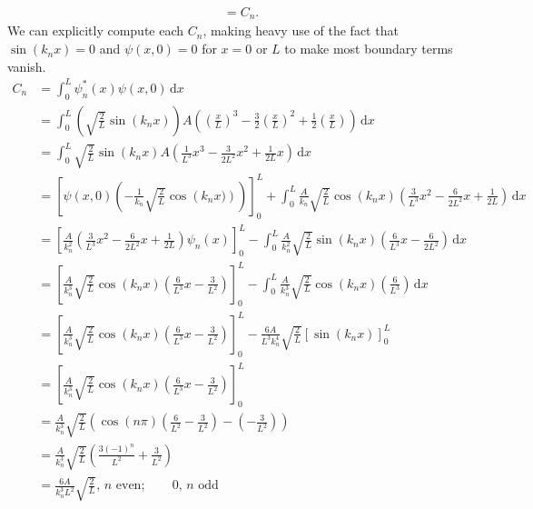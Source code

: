 \documentclass[11pt, letterpaper]{article}
\begin{document}
\begin{enumerate}
\begin{align*}
									 &=C_n
		.\end{align*}
		We can explicitly compute each $C_n$, making heavy use of the fact that $\sin (k_nx)=0$ and $\psi (x,0)=0$ for $x=0$ or $L$ to make most boundary terms vanish.
		\begin{align*}
			C_n&=\int_{0}^{L} \psi _n^*(x)\psi (x,0) \,\mathrm{d} x\\
			   &=\int_{0}^{L} \left( \sqrt{\frac{2}{L} } \sin (k_nx) \right) A\left( \left( \frac{x}{L}  \right)^3-\frac{3}{2} \left( \frac{x}{L}  \right) ^2+\frac{1}{2} \left( \frac{x}{L}  \right)  \right)  \,\mathrm{d} x\\
			   &=\int_{0}^{L} \sqrt{\frac{2}{L} } \sin \left( k_nx \right) A\left( \frac{1}{L^3} x^3-\frac{3}{2L^2} x^2+\frac{1}{2L} x \right)  \,\mathrm{d} x\\
			   &=\left[ \psi (x,0)\left( -\frac{1}{k_n} \sqrt{\frac{2}{L} } \cos \left( k_nx) \right)  \right)  \right]_{0}^{L} +\int_{0}^{L}\frac{A}{k_n} \sqrt{\frac{2}{L} } \cos \left( k_nx \right) \left( \frac{3}{L^3} x^2-\frac{6}{2L^2} x+\frac{1}{2L}  \right)   \,\mathrm{d} x\\
			   &=\left[ \frac{A}{k_n^2} \left( \frac{3}{L^3} x^2-\frac{6}{2L^2} x+\frac{1}{2L}  \right) \psi_n(x) \right]_0^L-\int_{0}^{L} \frac{A}{k_n^2} \sqrt{\frac{2}{L} } \sin \left( k_nx \right) \left( \frac{6}{L^3} x-\frac{6}{2L^2}  \right)  \,\mathrm{d} x\\
			   &=\left[ \frac{A}{k_n^3} \sqrt{\frac{2}{L} } \cos \left( k_nx \right) \left( \frac{6}{L^3} x-\frac{3}{L^2}  \right)  \right]_0^L-\int_{0}^{L} \frac{A}{k_n^3} \sqrt{\frac{2}{L} } \cos \left( k_nx \right) \left( \frac{6}{L^3}  \right)  \,\mathrm{d} x\\
			   &=\left[ \frac{A}{k_n^3} \sqrt{\frac{2}{L} } \cos \left( k_nx \right) \left( \frac{6}{L^3} x-\frac{3}{L^2}  \right)  \right]_0^L-\frac{6A}{L^3k_n^4} \sqrt{\frac{2}{L} } \left[ \sin \left( k_nx \right)  \right]_0^L\\
			   &=\left[ \frac{A}{k_n^3} \sqrt{\frac{2}{L} } \cos \left( k_nx \right) \left( \frac{6}{L^3} x-\frac{3}{L^2}  \right)  \right]_0^L\\
			   &=\frac{A}{k_n^3} \sqrt{\frac{2}{L} } \left( \cos \left( n\pi  \right) \left( \frac{6}{L^2} -\frac{3}{L^2}  \right) -\left( -\frac{3}{L^2}  \right)  \right) \\
			   &=\frac{A}{k_n^3} \sqrt{\frac{2}{L} } \left( \frac{3(-1)^n}{L^2} +\frac{3}{L^2}  \right) \\
			   &=\frac{6A}{k_n^3L^2} \sqrt{\frac{2}{L} } ,\,n\text{ even} ;\qquad 0,\,n\text{ odd} 

\end{align*}
\end{enumerate}
\end{document}

